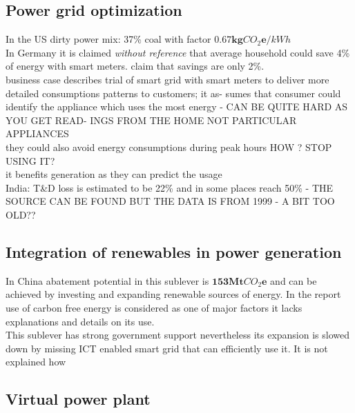 \documentclass[11pt, twocolumn]{article}
\begin{document}
\newpage
\subsection{Power grid optimization}

In the US dirty power mix: 37\% coal with factor $\mathbf{0.67} \mathbf{kg}CO_2\mathbf{e} / kWh$\\

In Germany it is claimed \emph{without reference} that average household could save 4\% of energy with smart meters. \citep{bbc:smartmeters} claim that savings are only 2\%.\\
business case describes trial of smart grid with smart meters to deliver more detailed consumptions patterns to customers; it as- sumes that consumer could identify the appliance which uses the most energy - CAN BE QUITE HARD AS YOU GET READ- INGS FROM THE HOME NOT PARTICULAR APPLIANCES\\
they could also avoid energy consumptions during peak hours HOW ? STOP USING IT?\\
it benefits generation as they can predict the usage\\

India: T\&D loss is estimated to be 22\% and in some places reach 50\% - THE SOURCE CAN BE FOUND BUT THE DATA IS FROM 1999 - A BIT TOO OLD??\\



\subsection{Integration of renewables in power generation}


In China abatement potential in this sublever is $\mathbf{153} \mathbf{Mt}CO_2\mathbf{e}$ and can be achieved by investing and expanding renewable sources of energy. In the report use of carbon free energy is considered as one of major factors it lacks explanations and details on its use.\\
This sublever has strong government support nevertheless its expansion is slowed down by missing ICT enabled smart grid that can efficiently use it. It is not explained how 
\newpage





\subsection{Virtual power plant}
\end{document}
